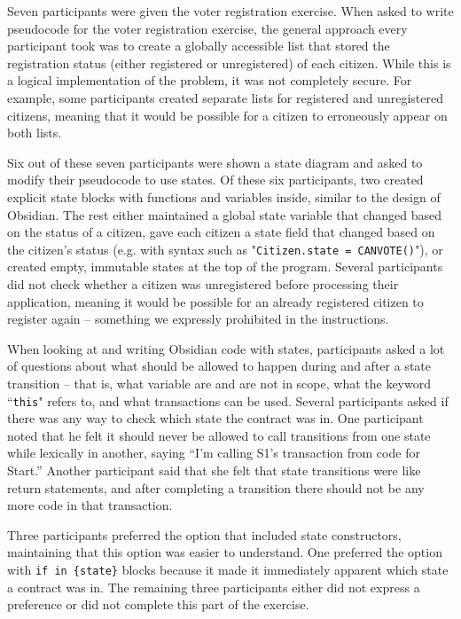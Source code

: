 \documentclass[sigplan,10pt,review]{acmart}\settopmatter{printfolios=true}
\begin{document}
Seven participants were given the voter registration exercise. When asked to write pseudocode for the voter registration exercise, the 
general approach every participant took was to create a globally accessible list that stored the registration status (either registered or 
unregistered) of each citizen. While this is a logical implementation of the problem, it was not completely secure. For example, some 
participants created separate lists for registered and unregistered citizens, meaning that it would be possible for a citizen to erroneously 
appear on both lists. 
 	
Six out of these seven participants were shown a state diagram and asked to modify their pseudocode to use states. Of these six 
participants, two created explicit state blocks with functions and variables inside, similar to the design of Obsidian. The rest either maintained a global state variable that 
changed based on the status of a citizen, gave each citizen a state field that changed based on the citizen's status (e.g. with syntax such as 
"\texttt{\small{Citizen.state = CANVOTE()}}"), or created empty, immutable states at the top of the program. Several participants did not check whether a 
citizen was unregistered before processing their application, meaning it would be possible for an already registered citizen to register again 
-- something we expressly prohibited in the instructions. 
	
When looking at and writing Obsidian code with states, participants asked a lot of questions about what should be allowed to happen 
during and after a state transition -- that is, what variable are and are not in scope, what the keyword ``\texttt{\small{this}}" refers to, and what transactions 
can be used. Several participants asked if there was any way to check which state the contract was in. One participant noted that he felt it 
should never be allowed to call transitions from one state while lexically in another, saying ``I'm calling S1's transaction from code for Start.''
Another participant said that she felt that state transitions were like return statements, and after completing a transition there should not be 
any more code in that transaction.

Three participants preferred the option that included state constructors, maintaining that this option was easier to understand. One preferred the option with \texttt{\small{if in \{state\}}} blocks because it made it immediately apparent which state a contract was in. The remaining three participants either did not express a preference or did not complete this part of the exercise. 
\end{document}
